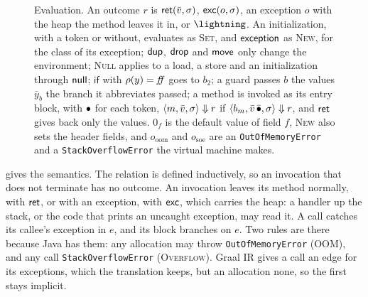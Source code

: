 \begin{figure}[tbp]
\begin{mathpar}






\end{mathpar}
\caption{Evaluation. An outcome $r$ is $\mathsf{ret}(\bar v, \sigma)$, $\mathsf{exc}(o, \sigma)$,
an exception $o$ with the heap the method leaves it in, or $\Trap$. An
initialization, with a token or without, evaluates as \textsc{Set}, and
$\mathsf{exception}$ as \textsc{New}, for the class of its exception; $\mathsf{dup}$, $\mathsf{drop}$ and
$\mathsf{move}$ only change the environment; \textsc{Null} applies to a load, a store
and an initialization through $\mathsf{null}$; $\mathsf{if}$ with $\rho(y) = \mathit{ff}$
goes to $b_2$; a guard passes $b$ the values $\bar y_b$ the branch it abbreviates
passed; a method is invoked as its entry block, with $\bullet$ for each token,
$\langle m, \bar v, \sigma \rangle \Downarrow r$ if $\langle b_m, \bar v\,\bar{\bullet}, \sigma \rangle
\Downarrow r$, and $\mathsf{ret}$ gives back only the values. $0_f$ is the default value
of field $f$, \textsc{New} also sets the header fields, and $o_{\mathrm{oom}}$
and $o_{\mathrm{soe}}$ are an \texttt{OutOfMemoryError} and a
\texttt{StackOverflowError} the virtual machine makes.}
\label{fig:ee-semantics}
\end{figure}

 gives the semantics. The relation is defined
inductively, so an invocation that does not terminate has no outcome. An
invocation leaves its method normally, with $\mathsf{ret}$, or with an exception, with
$\mathsf{exc}$, which carries the heap: a handler up the stack, or the code that prints
an uncaught exception, may read it. A call catches its callee's exception in
$e$, and its block branches on $e$. Two rules are there because Java has them:
any allocation may throw \texttt{OutOfMemoryError} (\textsc{OOM}), and any call
\texttt{StackOverflowError} (\textsc{Overflow}). Graal IR gives a call an edge
for its exceptions, which the translation keeps, but an allocation none, so
the first stays implicit.

